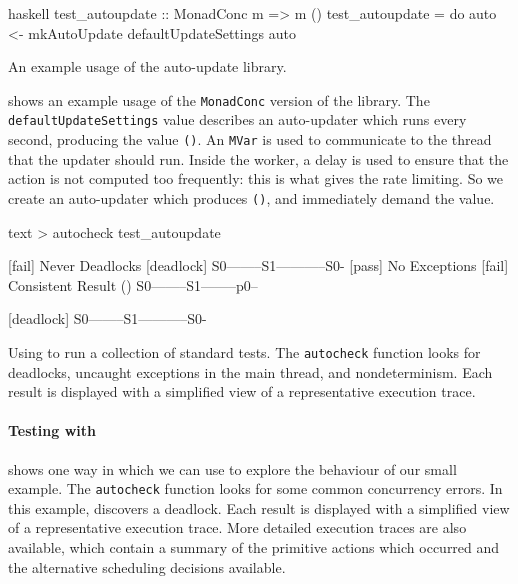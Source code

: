 \begin{listing}
\centering
\begin{cminted}{haskell}
test_autoupdate :: MonadConc m => m ()
test_autoupdate = do
  auto <- mkAutoUpdate defaultUpdateSettings
  auto
\end{cminted}
\caption{An example usage of the auto-update library.}\label{lst:autoupdate_example1}
\end{listing}

 shows an example usage of the
\verb|MonadConc| version of the library.  The
\verb|defaultUpdateSettings| value describes an auto-updater which
runs every second, producing the value \verb|()|.  An \verb|MVar| is
used to communicate to the thread that the updater should run.  Inside
the worker, a delay is used to ensure that the action is not computed
too frequently: this is what gives the rate limiting.  So we create an
auto-updater which produces \verb|()|, and immediately demand the
value.

\begin{listing}
\centering
\begin{cminted}{text}
> autocheck test_autoupdate

[fail] Never Deadlocks
        [deadlock] S0--------S1-----------S0-
[pass] No Exceptions
[fail] Consistent Result
        () S0--------S1--------p0--

        [deadlock] S0--------S1-----------S0-
\end{cminted}
\caption[Using \dejafu{} to run a collection of standard tests.]{Using \dejafu{} to run a collection of standard tests.  The \texttt{autocheck} function looks for deadlocks, uncaught exceptions in the main thread, and nondeterminism.  Each result is displayed with a simplified view of a representative execution trace.}\label{lst:autoupdate_example2}
\end{listing}

\paragraph{Testing with \dejafu{}}
 shows one way in which we can use
\dejafu{} to explore the behaviour of our small example.  The
\verb|autocheck| function looks for some common concurrency errors.
In this example, \dejafu{} discovers a deadlock.  Each result is
displayed with a simplified view of a representative execution trace.
More detailed execution traces are also available, which contain a
summary of the primitive actions which occurred and the alternative
scheduling decisions available.

